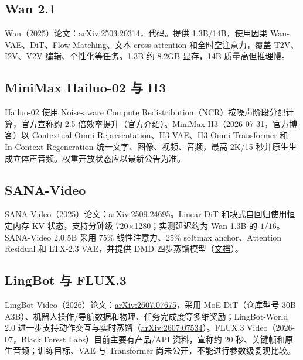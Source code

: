 \documentclass[UTF8,a4paper,12pt]{ctexart}
\begin{document}
\subsection{Wan 2.1}
Wan（2025）论文：\href{https://arxiv.org/abs/2503.20314}{arXiv:2503.20314}，\href{https://github.com/Wan-Video/Wan2.1}{代码}。提供 1.3B/14B，使用因果 Wan-VAE、DiT、Flow Matching、文本 cross-attention 和全时空注意力，覆盖 T2V、I2V、V2V 编辑、个性化等任务。1.3B 约 8.2GB 显存，14B 质量高但推理慢。

\subsection{MiniMax Hailuo-02 与 H3}
Hailuo-02 使用 Noise-aware Compute Redistribution（NCR）按噪声阶段分配计算，官方宣称约 2.5 倍效率提升（\href{https://www.minimax.io/news/minimax-hailuo-02}{官方介绍}）。MiniMax H3（2026-07-31，\href{https://www.minimax.io/blog/minimax-h3}{官方博客}）以 Contextual Omni Representation、H3-VAE、H3-Omni Transformer 和 In-Context Regeneration 统一文字、图像、视频、音频，最高 2K/15 秒并原生生成立体声音频。权重开放状态应以最新公告为准。

\subsection{SANA-Video}
SANA-Video（2025）论文：\href{https://arxiv.org/abs/2509.24695}{arXiv:2509.24695}。Linear DiT 和块式自回归使用恒定内存 KV 状态，支持分钟级 720$\times$1280；实测延迟约为 Wan-1.3B 的 $1/16$。SANA-Video 2.0 5B 采用 75\% 线性注意力、25\% softmax anchor、Attention Residual 和 LTX-2.3 VAE，并提供 DMD 四步蒸馏模型（\href{https://nvlabs.github.io/Sana/docs/sana_video2/}{文档}）。

\subsection{LingBot 与 FLUX.3}
LingBot-Video（2026）论文：\href{https://arxiv.org/abs/2607.07675}{arXiv:2607.07675}，采用 MoE DiT（仓库型号 30B-A3B）、机器人操作/导航数据和物理、任务完成度等多维奖励；LingBot-World 2.0 进一步支持动作交互与实时蒸馏（\href{https://arxiv.org/abs/2607.07534}{arXiv:2607.07534}）。FLUX.3 Video（2026-07，Black Forest Labs）目前主要有产品/API 资料，宣称约 20 秒、关键帧和原生音频；训练目标、VAE 与 Transformer 尚未公开，不能进行参数级复现比较。
\end{document}
